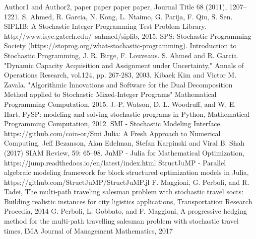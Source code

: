 
\begin{thebibliography}{9} 
	Author1 and Author2, paper paper paper paper, Journal Title 68 (2011), 1207--1221.
	S. Ahmed, R. Garcia, N. Kong, L. Ntaimo, G. Parija, F. Qiu, S. Sen. SIPLIB: A Stochastic Integer Programming Test Problem Library. http://www.isye.gatech.edu/~sahmed/siplib, 2015.
	SPS: Stochastic Programming Society (https://stoprog.org/what-stochastic-programming).
	Introduction to Stochastic Programming, J. R. Birge, F. Louveaus.
	S. Ahmed and R. Garcia. "Dynamic Capacity Acquisition and Assignment under Uncertainty," Annals of Operations Research, vol.124, pp. 267-283, 2003.
	Kibaek Kim and Victor M. Zavala. "Algorithmic Innovations and Software for the Dual Decomposition Method applied to Stochastic Mixed-Integer Programs" Mathematical Programming Computation, 2015.
	J.-P. Watson, D. L. Woodruff, and W. E. Hart, PySP: modeling and solving stochastic programs in Python, Mathematical Programming Computation, 2012.
	SMI - Stochastic Modeling Interface. https://github.com/coin-or/Smi
	Julia: A Fresh Approach to Numerical Computing. Jeff Bezanson, Alan Edelman, Stefan Karpinski and Viral B. Shah (2017) SIAM Review, 59: 65–98.
	JuMP - Julia for Mathematical Optimization, https://jump.readthedocs.io/en/latest/index.html
	StructJuMP - Parallel algebraic modeling framework for block structured optimization models in Julia, https://github.com/StructJuMP/StructJuMP.jl
	F. Maggioni, G. Perboli, and R. Tadei, The multi-path traveling salesman problem with stochastic travel socts: Building realistic instances for city ligistics applications, Transportation Research Procedia, 2014
	G. Perboli, L. Gobbato, and F. Maggioni, A progressive hedging method for the multi-path travelling salesman problem with stochastic travel times, IMA Journal of Management Mathematics, 2017

\end{thebibliography}
